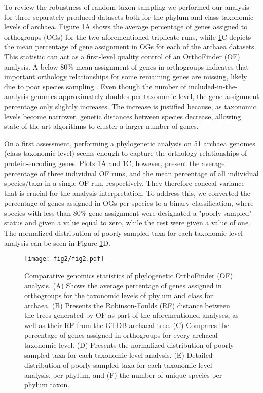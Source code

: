 To review the robustness of random taxon sampling we performed our analysis for three separately produced datasets both for the phylum and class taxonomic levels of archaea. Figure \ref{orthofinder_stats_figure}A shows the average percentage of genes assigned to orthogroups (OGs) for the two aforementioned triplicate runs, while \ref{orthofinder_stats_figure}C depicts the mean percentage of gene assignment in OGs for each of the archaea datasets. This statistic can act as a first-level quality control of an OrthoFinder (OF) analysis. A below 80\% mean assignment of genes in orthogroups indicates that important orthology relationships for some remaining genes are missing, likely due to poor species sampling \cite{emms2015}. Even though the number of included-in-the-analysis genomes approximately doubles per taxonomic level, the gene assignment percentage only slightly increases. The increase is justified because, as taxonomic levels become narrower, genetic distances between species decrease, allowing state-of-the-art algorithms to cluster a larger number of genes.

On a first assessment, performing a phylogenetic analysis on 51 archaea genomes (class taxonomic level) seems enough to capture the orthology relationships of protein-encoding genes. Plots \ref{orthofinder_stats_figure}A and \ref{orthofinder_stats_figure}C, however, present the average percentage of three individual OF runs, and the mean percentage of all individual species/taxa in a single OF run, respectively. They therefore conceal variance that is crucial for the analysis interpretation. To address this, we converted the percentage of genes assigned in OGs per species to a binary classification, where species with less than 80\% gene assignment were designated a "poorly sampled" status and given a value equal to zero, while the rest were given a value of one. The normalized distribution of poorly sampled taxa for each taxonomic level analysis can be seen in Figure \ref{orthofinder_stats_figure}D.

\begin{figure}[H]
    \centering
    \texttt{[image: fig2/fig2.pdf]}
    \caption{Comparative genomics statistics of phylogenetic OrthoFinder (OF) analysis. (A) Shows the average percentage of genes assigned in orthogroups for the taxonomic levels of phylum and class for archaea. (B) Presents the Robinson-Foulds (RF) distance between the trees generated by OF as part of the aforementioned analyses, as well as their RF from the GTDB archaeal tree. (C) Compares the percentage of genes assigned in orthogroups for every archaeal taxonomic level. (D) Presents the normalized distribution of poorly sampled taxa for each taxonomic level analysis. (E) Detailed distribution of poorly sampled taxa for each taxonomic level analysis, per phylum, and (F) the number of unique species per phylum taxon.}
    \label{orthofinder_stats_figure}
\end{figure}   

